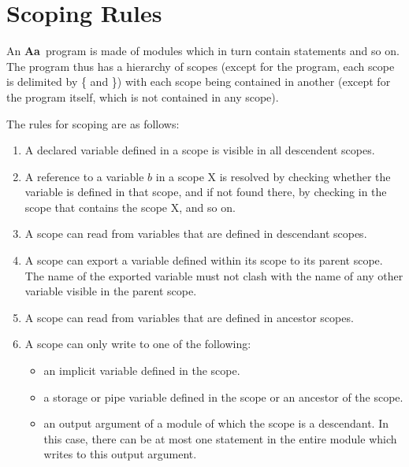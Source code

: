 \documentclass{article}
\newcommand{\Aa}{{\bf Aa}~}
\begin{document}
\section{Scoping Rules} \label{sec:Scopes}

An \Aa program is made of modules which in turn contain statements
and so on.  The program thus has a hierarchy of scopes 
(except for the program, each scope is delimited by \{ and \}) with each
scope being contained in another (except for the program itself,
which is not contained in any scope).

The rules for scoping are as follows:
\begin{enumerate}
\item A declared variable defined in a scope is visible
in all descendent scopes. 
\item A reference to a variable $b$ in a scope X is resolved by checking
whether the variable is defined in that scope, and if not found there,
by checking in the scope that contains the scope X, and so on.
\item A scope can read from variables that are defined in descendant
scopes.  
\item A scope can export a variable defined within its scope to
its parent scope.   The name  of the exported variable must not
clash with the name of any other variable visible in the
parent scope.
\item A scope can read from variables that are defined in ancestor scopes.
\item A scope can only write to one of the following:
\begin{itemize}
\item an implicit variable defined in the scope.
\item a storage or pipe variable defined in the scope or an ancestor
of the scope.
\item an output argument of a module of which the scope is a descendant.
In this case, there can be at most one statement in the entire module
which writes to this output argument.
\end{itemize}
\end{enumerate}
\end{document}
